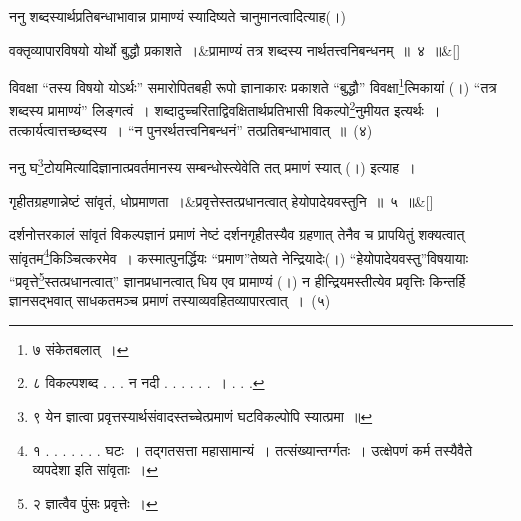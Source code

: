 \documentclass[article,12pt,a4paper]{memoir}
\begin{document}
	

	  \pstart ननु शब्दस्यार्थप्रतिबन्धाभावान्न प्रामाण्यं स्यादिष्यते चानुमानत्वादित्याह(।)
	\pend
      
	  \bigskip
	  \begingroup
	
	    \large
	  
	    
	    \stanza[\smallbreak]
	वक्तृव्यापारविषयो योर्थो बुद्धौ प्रकाशते ।&प्रामाण्यं तत्र शब्दस्य नार्थतत्त्वनिबन्धनम् ॥ ४ ॥\&[\smallbreak]


	
	  \endgroup
	

	   विवक्षा {\color{DodgerBlue3}“तस्य विषयो योऽर्थः”} समारोपितबही रूपो ज्ञानाकारः प्रकाशते {\color{DodgerBlue3}“बुद्धौ”} विवक्षा\footnote{\label{pvv.4-7}  ७ संकेतबलात् ।}त्मिकायां (।) {\color{DodgerBlue3}“तत्र शब्दस्य प्रामाण्यं”} लिङ्गत्वं । शब्दादुच्चरिताद्विवक्षितार्थप्रतिभासी विकल्पो\footnote{\label{pvv.4-8}  ८ विकल्पशब्द . . . न नदी . . . . . . । . . .}नुमीयत इत्यर्थः । तत्कार्यत्वात्तच्छब्दस्य । {\color{DodgerBlue3}“न पुनरर्थतत्त्वनिबन्धनं”} तत्प्रतिबन्धाभावात् ॥ (४)
	\pend
      \label{div_pvv.1.5}
	  
	

	  \pstart ननु घ\footnote{\label{pvv.4-9}  ९ येन ज्ञात्वा प्रवृत्तस्यार्थसंवादस्तच्चेत्प्रमाणं घटविकल्पोपि स्यात्प्रमा ॥}टोयमित्यादिज्ञानात्प्रवर्तमानस्य सम्बन्धोस्त्येवेति तत् प्रमाणं स्यात् (।) इत्याह ।
	\pend
      \leavevmode{}
	  \bigskip
	  \begingroup
	
	    \large
	  
	    
	    \stanza[\smallbreak]
	गृहीतग्रहणान्नेष्टं सांवृतं, धोप्रमाणता ।&प्रवृत्तेस्तत्प्रधानत्वात् हेयोपादेयवस्तुनि ॥ ५ ॥\&[\smallbreak]


	
	  \endgroup
	

	   दर्शनोत्तरकालं सांवृतं विकल्पज्ञानं प्रमाणं नेष्टं \leavevmode{} दर्शनगृहीतस्यैव ग्रहणात् तेनैव च प्रापयितुं शक्यत्वात् सांवृतम\footnote{\label{pvv.5-1}  १ . . . . . . . घटः । तद्गतसत्ता महासामान्यं । तत्संख्यान्तर्ग्गतः । उत्क्षेपणं कर्म तस्यैवैते व्यपदेशा इति सांवृताः ।}किञ्चित्करमेव । कस्मात्पुनर्द्धियः {\color{DodgerBlue3}“प्रमाण”}तेष्यते नेन्द्रियादेः(।) {\color{DodgerBlue3}“हेयोपादेयवस्तु”}विषयायाः {\color{DodgerBlue3}“प्रवृत्ते\footnote{\label{pvv.5-2}  २ ज्ञात्वैव पुंसः प्रवृत्तेः ।}स्तत्प्रधानत्वात्”} ज्ञानप्रधानत्वात् धिय एव प्रामाण्यं (।) न हीन्द्रियमस्तीत्येव प्रवृत्तिः किन्तर्हि ज्ञानसद्भवात् साधकतमञ्च प्रमाणं तस्याव्यवहितव्यापारत्वात् । (५)
	\pend
      \label{div_pvv.1.6}
	  
\end{document}
